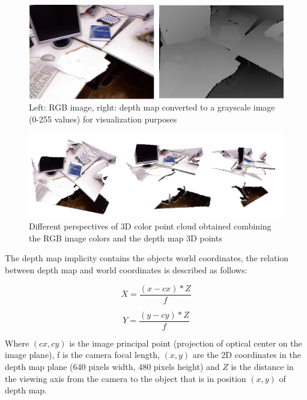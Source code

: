 \begin{figure}[h!]
\begin{center}
\includegraphics[scale=0.3]{images/color_depth.png}
\caption{Left: RGB image, right: depth map converted to a grayscale image (0-255 values) for visualization purposes}
\label{fig:colordepth}
\end{center}
\end{figure}


\begin{figure}[h!]
\begin{center}
\includegraphics[scale=0.25]{images/3d_point_cloud.png}
\caption{Different perspectives of 3D color point cloud obtained combining the RGB image colors and the depth map 3D points}
\label{fig:colorpcloud}
\end{center}
\end{figure}


The depth map implicity contains the objects world coordinates, the relation between depth map 
and world coordinates is described as follows:

\begin{equation}
\label{eq:dasdf}
 X=\frac{(x-cx)*Z}{f}
\end{equation}

\begin{equation}
\label{eq:dispadsfy2}
 Y=\frac{(y-cy)*Z}{f}
\end{equation}


Where $(cx,cy)$ is the image principal point (projection of optical center on the image plane), f is the camera 
focal length, $(x,y)$ are the 2D coordinates in the depth map plane (640 pixels width, 480 pixels height) and $Z$ is the distance in the viewing axis from the camera to the object that is in position $(x,y)$ of depth map.

